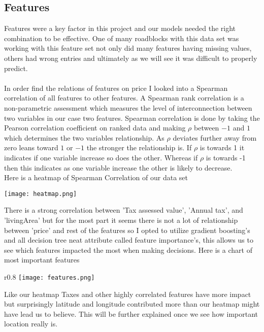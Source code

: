 \documentclass{article}
\begin{document}
\begin{titlepage}
\subsection{Features}
Features were a key factor in this project and our models needed the right combination to be effective. One of many roadblocks with this data set was working with this feature set not only did many features having missing values, others had wrong entries and ultimately as we will see it was difficult to properly predict. \\
\\ 
In order find the relations of features on price I looked into a Spearman correlation of all features to other features. A Spearman rank correlation is a non-parametric assessment which measures the level of interconnection between two variables in our case two features. Spearman correlation is done by taking the Pearson correlation coefficient on ranked data and making $\rho$ between $-1$ and $1$ which determines the two variables relationship. As $\rho$ deviates further away from zero leans toward $1$ or $-1$ the stronger the relationship is. If $\rho$ is towards 1 it indicates if one variable increase so does the other. Whereas if $\rho$ is towards -1 then this indicates as one variable increase the other is likely to decrease.\\

Here is a heatmap of Spearman Correlation of our data set
    \begin{center}
        \texttt{[image: heatmap.png]}
    \end{center}

There is a strong correlation between 'Tax assessed value', 'Annual tax', and 'livingArea' but for the most part it seems there is not a lot of relationship between 'price' and rest of the features so I opted to utilize gradient boosting's and all decision tree neat attribute called feature importance's, this allows us to see which features impacted the most when making decisions. Here is a chart of most important features 

\begin{wrapfigure}{r}{0.8\textwidth}
\texttt{[image: features.png]} 
\label{fig:wrapfig}
\end{wrapfigure}
Like our heatmap Taxes and other highly correlated features have more impact but surprisingly latitude and longitude contributed more than our heatmap might have lead us to believe. This will be further explained once we see how important location really is.  

\end{titlepage}
\end{document}
